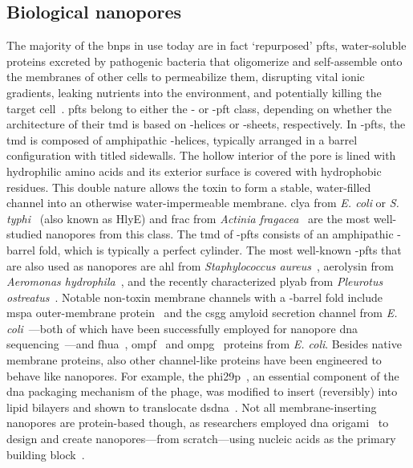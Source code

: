 \subsection{Biological nanopores}
%

The majority of the \glspl{bnp} in use today are in fact `repurposed' \glspl{pft}, water-soluble proteins
excreted by pathogenic bacteria that oligomerize and self-assemble onto the membranes of other cells to
permeabilize them, disrupting vital ionic gradients, leaking nutrients into the environment, and potentially
killing the target cell~\cite{Peraro-2015}. \Glspl{pft} belong to either the \ta- or \tb-\gls{pft} class,
depending on whether the architecture of their \gls{tmd} is based on \ta-helices or \tb-sheets, respectively.
In \ta-\glspl{pft}, the \gls{tmd} is composed of amphipathic \ta-helices, typically arranged in a barrel
configuration with titled sidewalls. The hollow interior of the pore is lined with hydrophilic amino acids and
its exterior surface is covered with hydrophobic residues. This double nature allows the toxin to form a
stable, water-filled channel into an otherwise water-impermeable membrane. \Gls{clya} from \textit{E. coli} or
\textit{S. typhi}~\cite{Mueller-2009} (also known as HlyE) and \gls{frac} from \textit{Actinia
fragacea}~\cite{Tanaka-2015} are the most well-studied nanopores from this class. The \gls{tmd} of
\tb-\glspl{pft} consists of an amphipathic \tb-barrel fold, which is typically a perfect cylinder. The most
well-known \tb-\glspl{pft} that are also used as nanopores are \gls{ahl} from \textit{Staphylococcus
aureus}~\cite{Song-1996}, aerolysin from \textit{Aeromonas hydrophila}~\cite{Iacovache-2016}, and the recently
characterized \gls{plyab} from \textit{Pleurotus ostreatus}~\cite{Lukoyanova-Kondos-2015}. Notable non-toxin
membrane channels with a \tb-barrel fold include \gls{mspa} outer-membrane protein~\cite{Faller-2004} and the
\gls{csgg} amyloid secretion channel from \textit{E. coli}~\cite{Goyal-2014}---both of which have been
successfully employed for nanopore \gls{dna} sequencing~\cite{Manrao-2012,Brown-2016}---and
\gls{fhua}~\cite{Locher-1998}, \gls{ompf}~\cite{Yamashita-2008} and \gls{ompg}~\cite{Subbarao-2006} proteins
from \textit{E. coli}. Besides native membrane proteins, also other channel-like proteins have been engineered
to behave like nanopores. For example, the \gls{phi29p}~\cite{Xu-2019}, an essential component of the
\gls{dna} packaging mechanism of the  phage, was modified to insert (reversibly) into lipid bilayers
and shown to translocate \gls{dsdna}~\cite{Wendell-2009}. Not all membrane-inserting nanopores are
protein-based though, as researchers employed \gls{dna} origami~\cite{Rothemund-2006} to design and create
nanopores---from scratch---using nucleic acids as the primary building
block~\cite{Bell-2011,Langecker-2012,Burns-2013,Bell-2014,Gopfrich-2016,Gopfrich-2019}.


